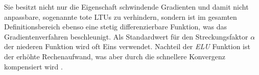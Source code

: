 Sie besitzt nicht nur die Eigenschaft schwindende Gradienten und damit nicht anpassbare, sogenannte \glqq tote\grqq{} LTUs zu verhindern, sondern ist im gesamten Definitionsbereich ebenso eine stetig differenzierbare Funktion, was das Gradientenverfahren beschleunigt. Als Standardwert für den Streckungsfaktor $\alpha$ der niederen Funktion wird oft Eins verwendet. Nachteil der \textit{ELU} Funktion ist der erhöhte Rechenaufwand, was aber durch die schnellere Konvergenz kompensiert wird \cite{AurelienGeron.2018}.

